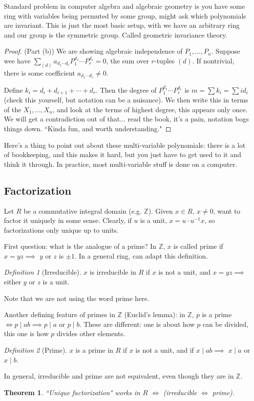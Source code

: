 \documentclass{article}
\theoremstyle{plain}
\newtheorem{theorem}{Theorem}
\theoremstyle{remark}
\newtheorem{definition}{Definition}
\newcommand{\Z}{{\mathbb Z}}
\begin{document}
Standard problem in computer algebra and algebraic geometry
is you have some ring with variables being permuted by some group,
might ask which polynomials are invariant.
This is just the most basic setup, with we have an arbitrary ring
and our group is the symmetric group.
Called geometric invariance theory.

\begin{proof}(Part (b))
	We are showing algebraic independence of $P_1,\dots,P_n$.
	Suppose wee have $\sum_{(d)}a_{d_1\cdots d_r}P_1^{d_1}\cdots P_r^{d_r} = 0$,
	the sum over $r$-tuples $(d)$.
	If nontrivial, there is some coefficient $a_{d_1\cdots d_r} \neq 0$.

	Define $k_i = d_i + d_{i+1} + \cdots + d_r$.
	Then the degree of $P_1^{d_1}\cdots P_r^{d_r}$ is
	$m = \sum k_i = \sum i d_i$
	(check this yourself, but notation can be a nuisance).
	We then write this in terms of the $X_1,\dots,X_n$,
	and look at the terms of highest degree,
	this appears only once.
	We will get a contradiction out of that...
	read the book, it's a pain, notation bogs things down.
	``Kinda fun, and worth understanding."
\end{proof}
Here's a thing to point out about these multi-variable polynomials:
there is a lot of bookkeeping, and this makes it hard,
but you just have to get used to it and think it through.
In practice, most multi-variable stuff is done on a computer.

\subsection{Factorization}
Let $R$ be a commutative integral domain (e.g. $\Z$).
Given $x \in R$, $x \neq 0$, want to factor it uniquely in some sense.
Clearly, if $u$ is a unit, $x = u\cdot u^{-1} x$,
so factorizations only unique up to units.

First question: what is the analogue of a prime?
In $\Z$, $x$ is called prime if $x = yz \implies$ $y$ or $z$ is $\pm 1$.
In a general ring, can adapt this definition.
\begin{definition}[Irreducible]
	$x$ is irreducible in $R$ if $x$ is not a unit,
	and $x = yz \implies$ either $y$ or $z$ is a unit.
\end{definition}
Note that we are not using the word prime here.

Another defining feature of primes in $\Z$ (Euclid's lemma):
in $\Z$, $p$ is a prime $\iff p \mid ab \implies p \mid a$ or $p \mid b$.
These are different: one is about how $p$ can be divided,
this one is how $p$ divides other elements.
\begin{definition}[Prime]
	$x$ is a prime in $R$ if $x$ is not a unit,
	and if $x \mid ab \implies$ $x \mid a$ or $x \mid b$.
\end{definition}
In general, irreducible and prime are not equivalent,
even though they are in $\Z$.
\begin{theorem}
	``Unique factorization" works in $R$
	$\iff$ (irreducible $\iff$ prime).
\end{theorem}
\end{document}
